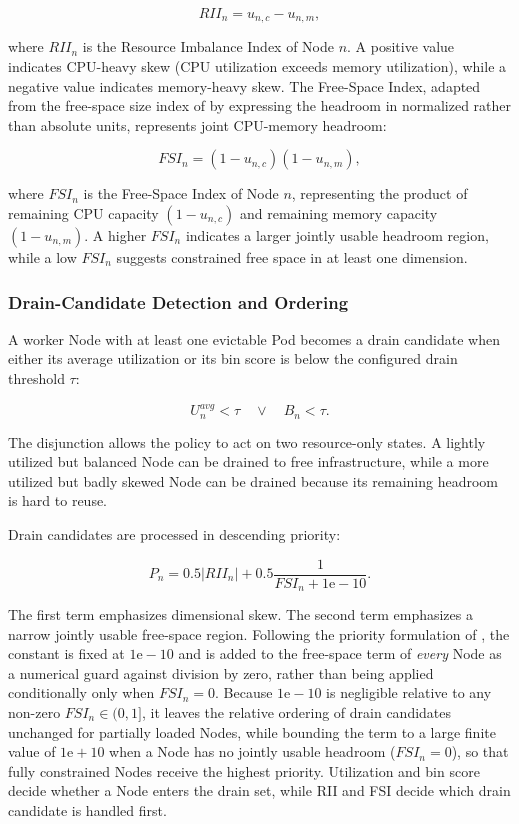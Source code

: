 \[
    RII_n = u_{n,c} - u_{n,m},
\]

where \(RII_n\) is the Resource Imbalance Index of Node \(n\). A positive value indicates CPU-heavy skew (CPU utilization exceeds memory utilization), while a negative value indicates memory-heavy skew. The Free-Space Index, adapted from the free-space size index of \cite{guo2025joint} by expressing the headroom in normalized rather than absolute units, represents joint CPU-memory headroom:

\[
    FSI_n = (1-u_{n,c})(1-u_{n,m}),
\]

where \(FSI_n\) is the Free-Space Index of Node \(n\), representing the product of remaining CPU capacity \((1-u_{n,c})\) and remaining memory capacity \((1-u_{n,m})\). A higher \(FSI_n\) indicates a larger jointly usable headroom region, while a low \(FSI_n\) suggests constrained free space in at least one dimension.

\subsubsection{Drain-Candidate Detection and Ordering}
\label{sec:defrag_drain_candidates}

A worker Node with at least one evictable Pod becomes a drain candidate when either its average utilization or its bin score is below the configured drain threshold \(\tau\):

\[
    U_n^{avg} < \tau
    \quad \lor \quad
    B_n < \tau.
\]

The disjunction allows the policy to act on two resource-only states. A lightly utilized but balanced Node can be drained to free infrastructure, while a more utilized but badly skewed Node can be drained because its remaining headroom is hard to reuse.

Drain candidates are processed in descending priority:

\[
    P_n =
    0.5\left|RII_n\right|
    +
    0.5\frac{1}{FSI_n+1\mathrm{e}{-}10}.
\]

The first term emphasizes dimensional skew. The second term emphasizes a narrow jointly usable free-space region. Following the priority formulation of \cite{guo2025joint}, the constant is fixed at \(1\mathrm{e}{-}10\) and is added to the free-space term of \emph{every} Node as a numerical guard against division by zero, rather than being applied conditionally only when \(FSI_n = 0\). Because \(1\mathrm{e}{-}10\) is negligible relative to any non-zero \(FSI_n \in (0,1]\), it leaves the relative ordering of drain candidates unchanged for partially loaded Nodes, while bounding the term to a large finite value of \(1\mathrm{e}{+}10\) when a Node has no jointly usable headroom (\(FSI_n = 0\)), so that fully constrained Nodes receive the highest priority. Utilization and bin score decide whether a Node enters the drain set, while RII and FSI decide which drain candidate is handled first.

